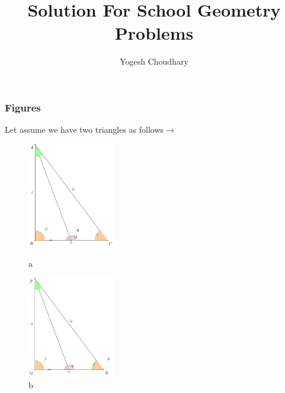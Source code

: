 \documentclass{beamer}
\title{\textbf{Solution For School Geometry Problems}}
\author{Yogesh Choudhary}
\begin{document}
	\frame{
			\titlepage
		  }
	  
	  	
	  	
	    \begin{frame}    	
			\frametitle{Figures}
	    		 Let assume we have two triangles as follows$\to$\\
	    		 
	    	\begin{figure}[!htb]
	    		\begin{minipage}{0.48\textwidth}
	    			\centering
	    			\includegraphics[width=1.5in]{./figures/congurentpicabc.pdf}
	    			\caption{a}
	    			\label{fig:triangle}
	    		\end{minipage}
	    		\hfill
	    		\begin{minipage}{0.48\textwidth}
	    			\centering
	    			\includegraphics[width=1.5in]{./figures/congurentpicabc2.pdf}
	    			\caption{b}
	    			\label{fig:triangle2}
	    		\end{minipage}	
	    	\end{figure}
	    \end{frame}   
        
\end{document}

